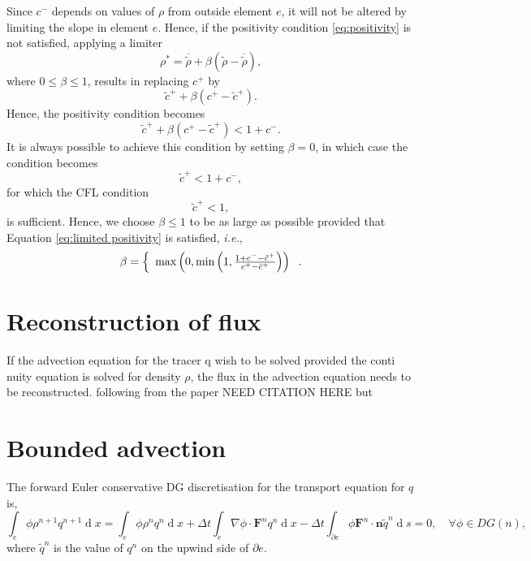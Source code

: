 \documentclass{article}
\def\MM#1{\boldsymbol{#1}}
\def\MM#1{\boldsymbol{#1}}
\DeclareMathOperator{\diff}{d}
\begin{document}
Since $c^-$ depends on values of $\rho$ from outside element $e$,
it will not be altered by limiting the slope in element $e$. Hence,
if the positivity condition \eqref{eq:positivity} is not satisfied,
applying a limiter
\begin{equation}
\rho^* = \overline{\tilde{\rho}} + \beta\left(
\tilde{\rho} - \overline{\tilde{\rho}}
\right),
\end{equation}
where $0\le \beta \le 1$, results in replacing $c^+$ by
\begin{equation}
\tilde{c}^+ + \beta(c^+-\tilde{c}^+).
\end{equation}
Hence, the positivity condition becomes
\begin{equation}
\label{eq:limited positivity}
\tilde{c}^+ + \beta(c^+-\tilde{c}^+) < 1 + c^-.
\end{equation}
It is always possible to achieve this condition by setting
$\beta=0$, in which case the condition becomes
\begin{equation}
\tilde{c}^+ < 1 + c^-,
\end{equation}
for which the CFL condition
\begin{equation}
\tilde{c}^+ < 1,
\end{equation}
is sufficient. Hence, we choose $\beta\leq 1$ to be as
large as possible provided that Equation \eqref{eq:limited positivity}
is satisfied, \emph{i.e.},
\begin{equation}
\beta =
\left\{
\begin{array}{c r}
 \max\left(0,\min\left(1,\frac{1 + c^- - \tilde{c}^+}
{c^+-\tilde{c}^+}\right)\right)
\end{array}\right..
\end{equation}

\section{Reconstruction of flux}
If the advection equation for the tracer q wish to be solved provided the conti
nuity equation is solved for density $\rho$, the flux in the advection equation
needs to be reconstructed. following from the paper {NEED CITATION HERE}
but
\section{Bounded advection}

The forward Euler conservative DG discretisation for the transport
equation for $q$ is,
\begin{equation}
\int_e \phi \rho^{n+1}q^{n+1} \diff x 
= \int_e \phi \rho^nq^n \diff x 
+ \Delta t \int_e \nabla \phi \cdot\MM{F}^n q^n\diff x
- \Delta t\int_{\partial e} \phi \MM{F}^n\cdot\MM{n} \tilde{q}^n \diff s = 0,
\quad \forall \phi \in DG(n),
\end{equation}
where $\tilde{q}^n$ is the value of $q^n$ on the upwind side of
$\partial e$.
\end{document}
